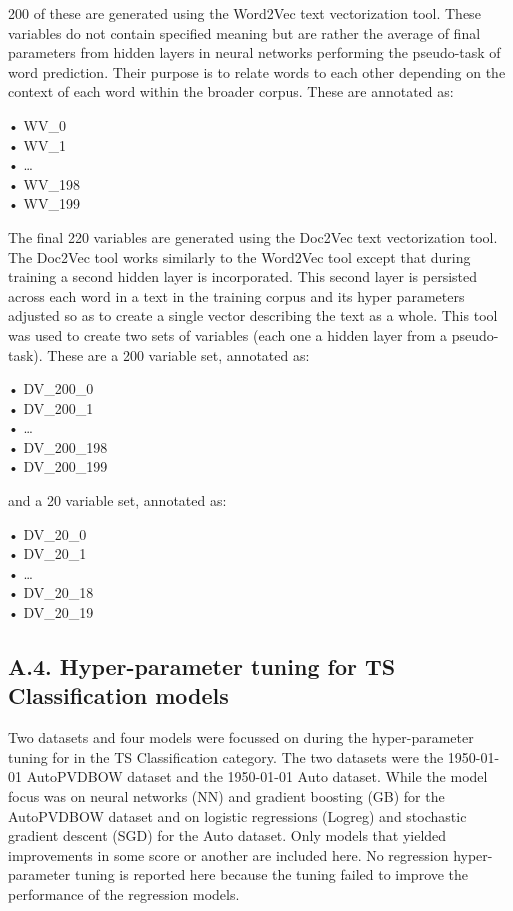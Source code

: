 \documentclass[11pt,preprint, authoryear]{elsarticle}
\numberwithin{equation}{section}
\numberwithin{figure}{section}
\numberwithin{table}{section}
\begin{document}
200 of these are generated using the Word2Vec text vectorization tool.
These variables do not contain specified meaning but are rather the
average of final parameters from hidden layers in neural networks
performing the pseudo-task of word prediction. Their purpose is to
relate words to each other depending on the context of each word within
the broader corpus. These are annotated as:

• WV\_0\\
• WV\_1\\
• \ldots{}\\
• WV\_198\\
• WV\_199

The final 220 variables are generated using the Doc2Vec text
vectorization tool. The Doc2Vec tool works similarly to the Word2Vec
tool except that during training a second hidden layer is incorporated.
This second layer is persisted across each word in a text in the
training corpus and its hyper parameters adjusted so as to create a
single vector describing the text as a whole. This tool was used to
create two sets of variables (each one a hidden layer from a
pseudo-task). These are a 200 variable set, annotated as:

• DV\_200\_0\\
• DV\_200\_1\\
• \ldots{}\\
• DV\_200\_198\\
• DV\_200\_199

and a 20 variable set, annotated as:

• DV\_20\_0\\
• DV\_20\_1\\
• \ldots{}\\
• DV\_20\_18\\
• DV\_20\_19

\hypertarget{a.4.-hyper-parameter-tuning-for-ts-classification-models}{%
\subsection*{A.4. Hyper-parameter tuning for TS Classification
models}\label{a.4.-hyper-parameter-tuning-for-ts-classification-models}}

Two datasets and four models were focussed on during the hyper-parameter
tuning for in the TS Classification category. The two datasets were the
1950-01-01 AutoPVDBOW dataset and the 1950-01-01 Auto dataset. While the
model focus was on neural networks (NN) and gradient boosting (GB) for
the AutoPVDBOW dataset and on logistic regressions (Logreg) and
stochastic gradient descent (SGD) for the Auto dataset. Only models that
yielded improvements in some score or another are included here. No
regression hyper-parameter tuning is reported here because the tuning
failed to improve the performance of the regression models.
\end{document}

